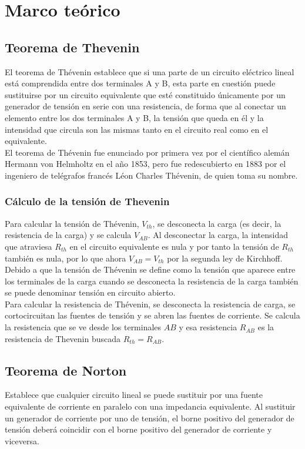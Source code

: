 \documentclass[a4paper,11pt]{report}
\begin{document}
\chapter{Marco teórico}
\section{Teorema de Thevenin}
El teorema de Thévenin establece que si una parte de un circuito eléctrico lineal está comprendida entre dos terminales A y B, esta parte en cuestión puede sustituirse por un circuito equivalente que esté constituido únicamente por un generador de tensión en serie con una resistencia, de forma que al conectar un elemento entre los dos terminales A y B, la tensión que queda en él y la intensidad que circula son las mismas tanto en el circuito real como en el equivalente.\\
El teorema de Thévenin fue enunciado por primera vez por el científico alemán Hermann von Helmholtz en el año 1853, pero fue redescubierto en 1883 por el ingeniero de telégrafos francés Léon Charles Thévenin, de quien toma su nombre.
\subsection{Cálculo de la tensión de Thevenin}
Para calcular la tensión de Thévenin, $V_{th}$, se desconecta la carga (es decir, la resistencia de la carga) y se calcula $V_{AB}$. Al desconectar la carga, la intensidad que atraviesa $R_{th}$ en el circuito equivalente es nula y por tanto la tensión de $R_{th}$ también es nula, por lo que ahora $V_{AB} = V_{th}$ por la segunda ley de Kirchhoff.
Debido a que la tensión de Thévenin se define como la tensión que aparece entre los terminales de la carga cuando se desconecta la resistencia de la carga también se puede denominar tensión en circuito abierto.\\
Para calcular la resistencia de Thévenin, se desconecta la resistencia de carga, se cortocircuitan las fuentes de tensión y se abren las fuentes de corriente. Se calcula la resistencia que se ve desde los terminales $AB$ y esa resistencia $R_{AB}$ es la resistencia de Thevenin buscada $R_{th} = R_{AB}$.
\section{Teorema de Norton}
Establece que cualquier circuito lineal se puede sustituir por una fuente equivalente de corriente en paralelo con una impedancia equivalente. Al sustituir un generador de corriente por uno de tensión, el borne positivo del generador de tensión deberá coincidir con el borne positivo del generador de corriente y viceversa. 
\end{document}
